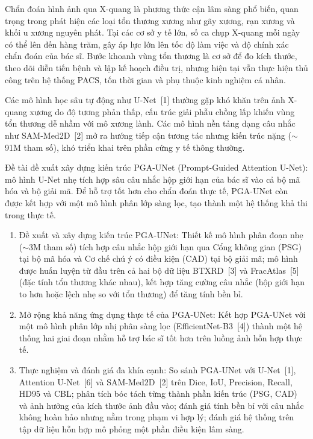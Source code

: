 \pagebreak


\medskip
{}

\medskip
Chẩn đoán hình ảnh qua X-quang là phương thức cận lâm sàng phổ biến, quan trọng trong phát hiện các loại tổn thương xương như gãy xương, rạn xương và khối u xương nguyên phát. Tại các cơ sở y tế lớn, số ca chụp X-quang mỗi ngày có thể lên đến hàng trăm, gây áp lực lớn lên tốc độ làm việc và độ chính xác chẩn đoán của bác sĩ. Bước khoanh vùng tổn thương là cơ sở để đo kích thước, theo dõi diễn tiến bệnh và lập kế hoạch điều trị, nhưng hiện tại vẫn thực hiện thủ công trên hệ thống PACS, tốn thời gian và phụ thuộc kinh nghiệm cá nhân.

Các mô hình học sâu tự động như U-Net~[1] thường gặp khó khăn trên ảnh X-quang xương do độ tương phản thấp, cấu trúc giải phẫu chồng lấp khiến vùng tổn thương dễ nhầm với mô xương lành. Các mô hình nền tảng dạng câu nhắc như SAM-Med2D~[2] mở ra hướng tiếp cận tương tác nhưng kiến trúc nặng ($\sim$91M tham số), khó triển khai trên phần cứng y tế thông thường.

Đề tài đề xuất xây dựng kiến trúc PGA-UNet (Prompt-Guided Attention U-Net): mô hình U-Net nhẹ tích hợp sâu câu nhắc hộp giới hạn của bác sĩ vào cả bộ mã hóa và bộ giải mã. Để hỗ trợ tốt hơn cho chẩn đoán thực tế, PGA-UNet còn được kết hợp với một mô hình phân lớp sàng lọc, tạo thành một hệ thống khả thi trong thực tế.

\medskip
{}

\medskip
\begin{enumerate}
    \item Đề xuất và xây dựng kiến trúc PGA-UNet: Thiết kế mô hình phân đoạn nhẹ ($\sim$3M tham số) tích hợp câu nhắc hộp giới hạn qua Cổng không gian (PSG) tại bộ mã hóa và Cơ chế chú ý có điều kiện (CAD) tại bộ giải mã; mô hình được huấn luyện từ đầu trên cả hai bộ dữ liệu BTXRD~[3] và FracAtlas~[5] (đặc tính tổn thương khác nhau), kết hợp tăng cường câu nhắc (hộp giới hạn to hơn hoặc lệch nhẹ so với tổn thương) để tăng tính bền bỉ.

    \item Mở rộng khả năng ứng dụng thực tế của PGA-UNet: Kết hợp PGA-UNet với một mô hình phân lớp nhị phân sàng lọc (EfficientNet-B3~[4]) thành một hệ thống hai giai đoạn nhằm hỗ trợ bác sĩ tốt hơn trên luồng ảnh hỗn hợp thực tế.

    \item Thực nghiệm và đánh giá đa khía cạnh: So sánh PGA-UNet với U-Net~[1], Attention U-Net~[6] và SAM-Med2D~[2] trên Dice, IoU, Precision, Recall, HD95 và CBL; phân tích bóc tách từng thành phần kiến trúc (PSG, CAD) và ảnh hưởng của kích thước ảnh đầu vào; đánh giá tính bền bỉ với câu nhắc không hoàn hảo nhưng nằm trong phạm vi hợp lý; đánh giá hệ thống trên tập dữ liệu hỗn hợp mô phỏng một phần điều kiện lâm sàng.
\end{enumerate}

